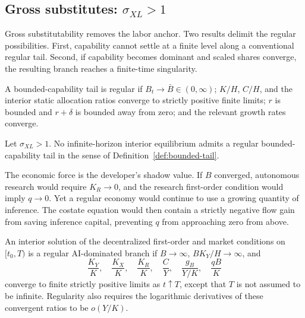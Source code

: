 \subsection{Gross substitutes: \texorpdfstring{$\sigma_{XL}>1$}{sigmaXL>1}}

Gross substitutability removes the labor anchor. Two results delimit the regular possibilities. First, capability cannot settle at a finite level along a conventional regular tail. Second, if capability becomes dominant and scaled shares converge, the resulting branch reaches a finite-time singularity.

\begin{definition}
\label{def:bounded-tail}
A bounded-capability tail is regular if $B_t\to\bar B\in(0,\infty)$; $K/H$, $C/H$, and the interior static allocation ratios converge to strictly positive finite limits; $r$ is bounded and $r+\delta$ is bounded away from zero; and the relevant growth rates converge.
\end{definition}

\begin{proposition}
\label{prop:no-bounded-B}
Let $\sigma_{XL}>1$. No infinite-horizon interior equilibrium admits a regular bounded-capability tail in the sense of Definition~\ref{def:bounded-tail}.
\end{proposition}

The economic force is the developer's shadow value. If $B$ converged, autonomous research would require $K_R\to0$, and the research first-order condition would imply $q\to0$. Yet a regular economy would continue to use a growing quantity of inference. The costate equation would then contain a strictly negative flow gain from saving inference capital, preventing $q$ from approaching zero from above.

\begin{definition}
\label{def:AI-branch}
An interior solution of the decentralized first-order and market conditions on $[t_0,T)$ is a regular AI-dominated branch if $B\to\infty$, $BK_Y/H\to\infty$, and
\[
 \frac{K_Y}{K},\quad\frac{K_X}{K},\quad\frac{K_R}{K},
 \quad\frac{C}{Y},\quad
 \frac{g_B}{Y/K},\quad\frac{qB}{K}
\]
converge to finite strictly positive limits as $t\uparrow T$, except that $T$ is not assumed to be infinite. Regularity also requires the logarithmic derivatives of these convergent ratios to be $o(Y/K)$.
\end{definition}

